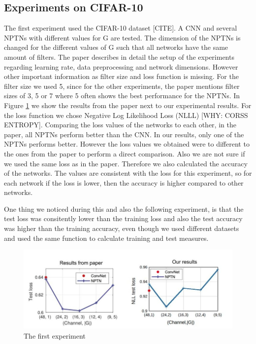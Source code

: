 \documentclass{llncs}
\begin{document}
\subsection{Experiments on CIFAR-10}
The first experiment used the CIFAR-10 dataset [CITE]. A CNN and several NPTNs with different values for G are tested. The dimension of the NPTNs is changed for the different values of G such that all networks have the same amount of filters.
The paper describes in detail the setup of the experiments regarding learning rate, data preprocessing and network dimensions. However other important information as filter size and loss function is missing. 
For the filter size we used 5, since for the other experiments, the paper mentions  filter sizes of 3, 5 or 7 where 5 often shows the best performance for the NPTNs. 
In Figure \ref{pic:first_experiment} we show the results from the paper next to our experimental results. For the loss function we chose Negative Log Likelihood Loss (NLLL) [WHY: CORSS ENTROPY]. 
Comparing the loss values of the networks to each other, in the paper, all NPTNs perform better than the CNN. In our results, only one of the NPTNs performs better.
However the loss values we obtained were to different to the ones from the paper to perform a direct comparison. 
Also we are not sure if we used the same loss as in the paper.  Therefore we also calculated the accuracy of the networks. The values are consistent with the loss for this experiment, so for each network if the loss is lower, then the accuracy is higher compared to other networks.

One thing we noticed during this and also the following experiment, is that the test loss was consitently lower than the training loss and also the test accuracy was higher than the training accuracy, even though we used different datasets and used the same function to calculate training and test measures.

\begin{figure}
	\begin{center}
	\includegraphics[scale=0.35]{result_images/experiment1.jpg}
	\caption{The first experiment}
	\label{pic:first_experiment}
	\end{center}
\end{figure}
\end{document}
